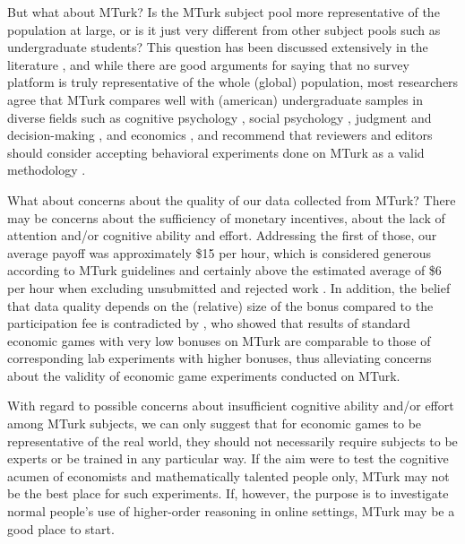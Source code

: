 \documentclass[12pt,review]{elsarticle}
\begin{document}
But what about MTurk? Is the MTurk subject pool more representative of the population at large, or is it just very different from other subject pools such as undergraduate students? This question has been discussed extensively in the literature \cite{BuhrmesterEtAl2011, chandler2015using, CrumpEtAl13, hauser2018common, HortonEtAl2011,  landers2015inconvenient, paolacci2014inside, Rand2012, stewart2015average}, and while there are good arguments for saying that no survey platform is truly representative of the whole (global) population, most researchers agree that MTurk compares well with (american) undergraduate samples in diverse fields such as cognitive psychology \cite{CrumpEtAl13}, social psychology \cite{klein2014investigating}, judgment and decision-making \cite{paolacci2010running}, and economics \cite{amir2012economic}, and recommend that reviewers and editors should consider accepting behavioral experiments done on MTurk as a valid methodology \cite{CrumpEtAl13, hauser2018common}.

What about concerns about the quality of our data collected from MTurk? There may be concerns about the sufficiency of monetary incentives, about the lack of attention and/or cognitive ability and effort. Addressing the first of those, our average payoff was approximately \$15 per hour, which is considered generous according to MTurk guidelines and certainly above the estimated average of \$6 per hour when excluding unsubmitted and rejected work \citep{HaraEtAl18}. In addition, the belief that data quality depends on the (relative) size of the bonus compared to the participation fee is contradicted by \citet{amir2012economic}, who showed that results of standard economic games with very low bonuses on MTurk are comparable to those of corresponding lab experiments with higher bonuses, thus alleviating concerns about the validity of economic game experiments conducted on MTurk. 

With regard to possible concerns about insufficient cognitive ability and/or effort among MTurk subjects, we can only suggest that for economic games to be representative of the real world, they should not necessarily require subjects to be experts or be trained in any particular way. If the aim were to test the cognitive acumen of economists and mathematically talented people only, MTurk may not be the best place for such experiments. If, however, the purpose is to investigate normal people's use of higher-order reasoning in online settings, MTurk may be a good place to start. 
\end{document}
